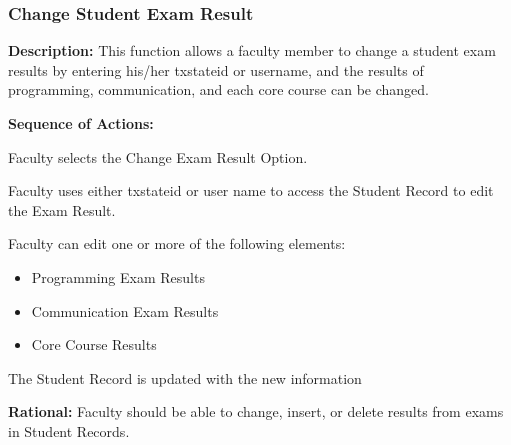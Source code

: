    \subsubsection{\large Change Student Exam Result} 
   \begin{boxed} %
      \textbf{Description:}
      {\small This function allows a faculty member to change a student exam
         results by entering his/her txstateid or username, and the results of
         programming, communication, and each core course can be changed.}
         
         \textbf{Sequence of Actions:}
         \begin{enumerate}
               {\small
            \item Faculty selects the Change Exam Result Option.
            \item Faculty uses either txstateid or user name to access the Student
               Record to edit the Exam Result.
            \item Faculty can edit one or more of the following elements:
            \begin{itemize}
               \item Programming Exam Results
               \item Communication Exam Results
               \item Core Course Results
            \end{itemize}
         \item The Student Record is updated with the new information}
      \end{enumerate}

         \textbf{Rational:}
         {\small Faculty should be able to change, insert, or delete results from exams
         in Student Records.}
   \end{boxed} %

